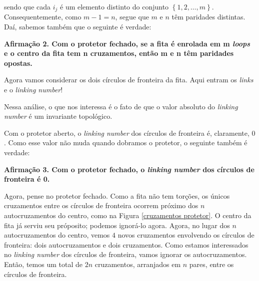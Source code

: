 	\par\vspace{0.3cm} sendo que cada $i_j$ é um elemento distinto do conjunto $\left\{1, 2, \dots, m \right\}$. Consequentemente, como $m-1=n$, segue que $m$ e $n$ têm paridades distintas. Daí, sabemos também que o seguinte é verdade:
	\begin{center}
		\textbf{Afirmação 2. Com o protetor fechado, se a fita é enrolada em m \textit{loops} e o centro da fita tem n cruzamentos, então m e n têm paridades opostas.}
	\end{center}
	\par\vspace{0.3cm} Agora vamos considerar os dois círculos de fronteira da fita. Aqui entram os \textit{links} e o \textit{linking number}!
	\par\vspace{0.3cm} Nessa análise, o que nos interessa é o fato de que o valor absoluto do \textit{linking number} é um invariante topológico.
	\par\vspace{0.3cm} Com o protetor aberto, o \textit{linking number} dos círculos de fronteira é, claramente, $0$. Como esse valor não muda quando dobramos o protetor, o seguinte também é verdade:
	\begin{center}
		\textbf{Afirmação 3. Com o protetor fechado, o \textit{linking number} dos círculos de fronteira é 0.}
	\end{center}
	\par\vspace{0.3cm} Agora, pense no protetor fechado. Como a fita não tem torções, os únicos cruzamentos entre os círculos de fronteira ocorrem próximo dos $n$ autocruzamentos do centro, como na Figura \eqref{cruzamentos protetor}. O centro da fita já serviu seu próposito; podemos ignorá-lo agora. Agora, no lugar dos $n$ autocruzamentos do centro, vemos $4$ novos cruzamentos envolvendo os círculos de fronteira: dois autocruzamentos e dois cruzamentos. Como estamos interessados no \textit{linking number} dos círculos de fronteira, vamos ignorar os autocruzamentos. Então, temos um total de $2n$ cruzamentos, arranjados em $n$ pares, entre os círculos de fronteira.
	
